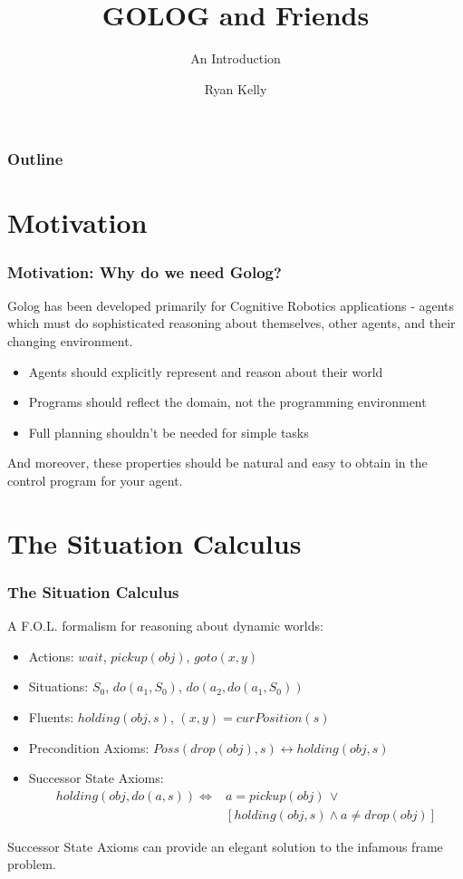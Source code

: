 \documentclass{beamer}
\title{GOLOG and Friends}
\subtitle{An Introduction}
\author{Ryan Kelly}
\begin{document}
\begin{frame}
  \titlepage
\end{frame}

\begin{frame}
  \frametitle{Outline}
  \tableofcontents
\end{frame}

\section{Motivation}

\begin{frame}
\frametitle{Motivation: Why do we need Golog?}
Golog has been developed primarily for Cognitive Robotics applications - agents
which must do sophisticated reasoning about themselves, other agents, and their
changing environment.
\begin{itemize}
\item Agents should explicitly represent and reason about their world
\item Programs should reflect the domain, not the programming environment
\item Full planning shouldn't be needed for simple tasks
\end{itemize}
And moreover, these properties should be natural and easy to obtain in the
control program for your agent.
\end{frame}


\section{The Situation Calculus}

\begin{frame}
\frametitle{The Situation Calculus}

A F.O.L. formalism for reasoning about dynamic worlds:

\begin{itemize}
\pause
\item Actions: $wait$, $pickup(obj)$, $goto(x,y)$
\pause
\item Situations: $S_{0}$, $do(a_{1},S_{0})$, $do(a_{2},do(a_{1},S_{0}))$
\pause
\item Fluents: $holding(obj,s)$, $(x,y)=curPosition(s)$
\pause
\item Precondition Axioms: $Poss(drop(obj),s) \leftrightarrow holding(obj,s)$
\pause
\item Successor State Axioms:\[
\begin{array}{cc}
holding(obj,do(a,s))\iff & a=pickup(obj)\,\vee\\
 & \left[holding(obj,s)\wedge a\neq drop(obj)\right]\end{array}\]
\end{itemize}
\pause
Successor State Axioms can provide an elegant solution to the infamous
frame problem.
\end{frame}
\end{document}
